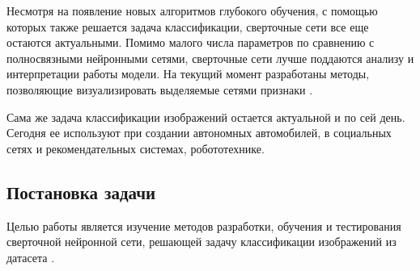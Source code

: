 Несмотря на появление новых алгоритмов глубокого обучения, с помощью которых также решается задача классификации, сверточные сети все еще остаются актуальными.
Помимо малого числа параметров по сравнению с полносвязными нейронными сетями, сверточные сети лучше поддаются анализу и интерпретации работы модели.
На текущий момент разработаны методы, позволяющие визуализировать выделяемые сетями признаки \cite{gradcam}.

Сама же задача классификации изображений остается актуальной и по сей день.
Сегодня ее используют при создании автономных автомобилей, в социальных сетях и рекомендательных системах, робототехнике.

\subsection*{Постановка задачи}
Целью работы является изучение методов разработки, обучения и тестирования сверточной нейронной сети, решающей задачу классификации изображений из датасета .